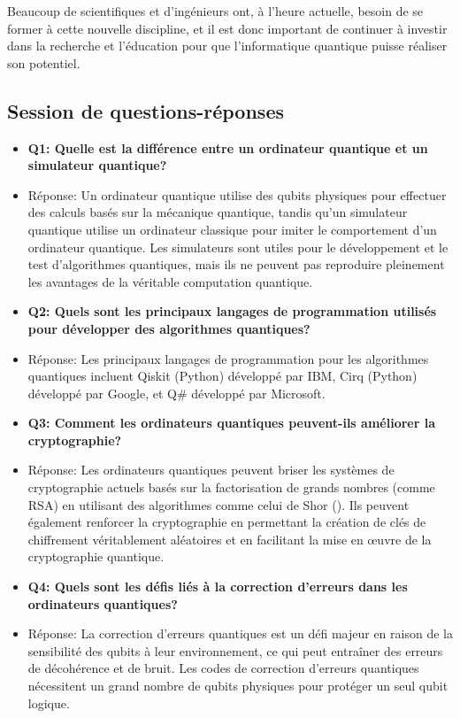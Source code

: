 \documentclass{article}
\begin{document}
Beaucoup de scientifiques et d'ingénieurs ont, à l'heure actuelle, besoin de se former à cette nouvelle discipline, et il est donc important de continuer à investir dans la recherche et l'éducation pour que l'informatique quantique puisse réaliser son potentiel.

\subsection{Session de questions-réponses}

\begin{itemize}
  \item \textbf{Q1: Quelle est la différence entre un ordinateur quantique et un simulateur quantique?}
  \item Réponse: Un ordinateur quantique utilise des qubits physiques pour effectuer des calculs basés sur la mécanique quantique, tandis qu'un simulateur quantique utilise un ordinateur classique pour imiter le comportement d'un ordinateur quantique. Les simulateurs sont utiles pour le développement et le test d'algorithmes quantiques, mais ils ne peuvent pas reproduire pleinement les avantages de la véritable computation quantique.

  \item \textbf{Q2: Quels sont les principaux langages de programmation utilisés pour développer des algorithmes quantiques?}
  \item Réponse: Les principaux langages de programmation pour les algorithmes quantiques incluent Qiskit (Python) développé par IBM, Cirq (Python) développé par Google, et Q\# développé par Microsoft.

  \item \textbf{Q3: Comment les ordinateurs quantiques peuvent-ils améliorer la cryptographie?}
  \item Réponse: Les ordinateurs quantiques peuvent briser les systèmes de cryptographie actuels basés sur la factorisation de grands nombres (comme RSA) en utilisant des algorithmes comme celui de Shor (\cite{wikipediaAlgorithmeShor}). Ils peuvent également renforcer la cryptographie en permettant la création de clés de chiffrement véritablement aléatoires et en facilitant la mise en œuvre de la cryptographie quantique.

  \item \textbf{Q4: Quels sont les défis liés à la correction d'erreurs dans les ordinateurs quantiques?}
  \item Réponse: La correction d'erreurs quantiques est un défi majeur en raison de la sensibilité des qubits à leur environnement, ce qui peut entraîner des erreurs de décohérence et de bruit. Les codes de correction d'erreurs quantiques nécessitent un grand nombre de qubits physiques pour protéger un seul qubit logique.


\end{itemize}
\end{document}
